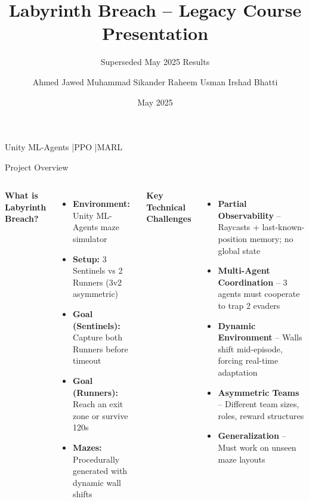\documentclass[aspectratio=169,11pt]{beamer}
\title{Labyrinth Breach -- Legacy Course Presentation}
\subtitle{Superseded May 2025 Results}
\author{Ahmed Jawed \quad Muhammad Sikander Raheem \quad Usman Irshad Bhatti}
\institute{MS AI, LUMS | AI641 -- AI for Robotics}
\date{May 2025}
\begin{document}
\begin{frame}
\titlepage
\vspace{-10pt}
\begin{center}
{\small Unity ML-Agents \quad|\quad PPO \quad|\quad MARL}
\end{center}
\end{frame}

\begin{frame}{Project Overview}
\begin{columns}[T]
\textbf{What is Labyrinth Breach?}
\begin{itemize}
\item \textbf{Environment:} Unity ML-Agents maze simulator
\item \textbf{Setup:} 3 Sentinels vs 2 Runners (3v2 asymmetric)
\item \textbf{Goal (Sentinels):} Capture both Runners before timeout
\item \textbf{Goal (Runners):} Reach an exit zone or survive 120s
\item \textbf{Mazes:} Procedurally generated with dynamic wall shifts
\end{itemize}

\textbf{Key Technical Challenges}
\begin{itemize}
\item \textbf{Partial Observability} -- Raycasts + last-known-position memory; no global state
\item \textbf{Multi-Agent Coordination} -- 3 agents must cooperate to trap 2 evaders
\item \textbf{Dynamic Environment} -- Walls shift mid-episode, forcing real-time adaptation
\item \textbf{Asymmetric Teams} -- Different team sizes, roles, reward structures
\item \textbf{Generalization} -- Must work on unseen maze layouts
\end{itemize}
\end{columns}
\end{frame}
\end{document}
